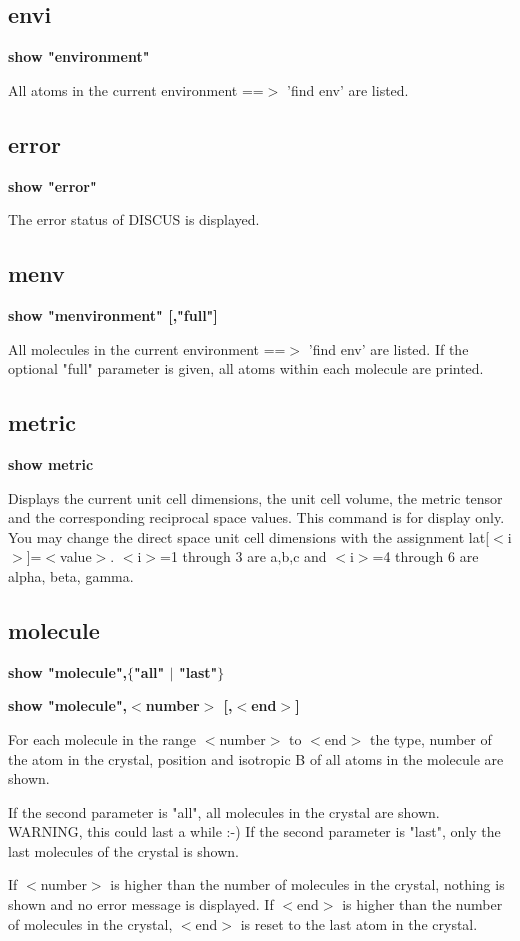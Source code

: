 \subsection*{envi}
{\bf show "environment" \par }
\par
\vspace{3pt}
All atoms in the current environment ==$> $ 'find env' are listed. 
\subsection*{error}
{\bf show "error" \par }
\par
\vspace{3pt}
The error status of DISCUS is displayed. 
\subsection*{menv}
{\bf show "menvironment" [,"full"] \par }
\par
\vspace{3pt}
All molecules in the current environment ==$> $ 'find env' are listed. 
If the optional "full" parameter is given, all atoms within each 
molecule are printed. 
\subsection*{metric}
{\bf show metric \par }
\par
\vspace{3pt}
Displays the current unit cell dimensions, the unit cell volume, the 
metric tensor and the corresponding reciprocal space values. 
This command is for display only. You may change the direct space 
unit cell dimensions with the assignment lat[$ <$i$> $]=$ <$value$> $. 
$ <$i$> $=1 through 3 are a,b,c and $ <$i$> $=4 through 6 are alpha, beta, gamma. 
\subsection*{molecule}
{\bf show "molecule",$ \{$"all" $| $ "last"$\} $ \par }
{\bf show "molecule",$ <$number$> $ [,$ <$end$> $] \par }
\par
\vspace{3pt}
For each molecule in the range $ <$number$> $ to $ <$end$> $ the type, number of the 
atom in the crystal, position and isotropic B of all atoms in the molecule 
are shown. 
\par
If the second parameter is "all", all molecules in the crystal are shown. 
WARNING, this could last a while :-) 
If the second parameter is "last", only the last molecules of the crystal 
is shown. 
\par
If $ <$number$> $ is higher than the number of molecules in the crystal, nothing 
is shown and no error message is displayed. 
If $ <$end$> $ is higher than the number of molecules in the crystal, $ <$end$> $ is 
reset to the last atom in the crystal. 
